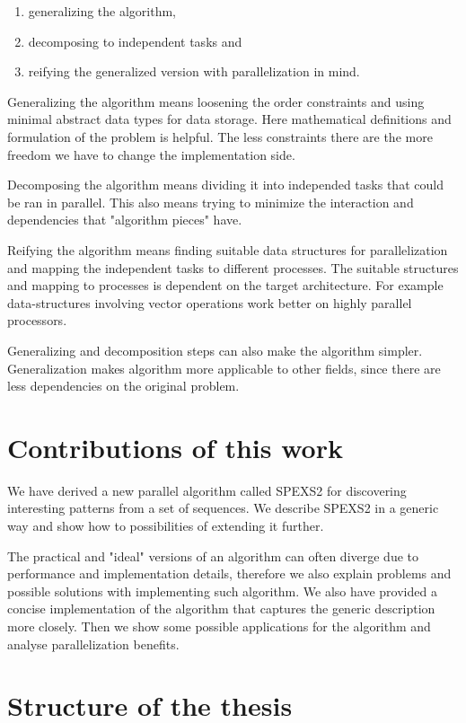 \begin{enumerate}
	\item generalizing the algorithm,
	\item decomposing to independent tasks and
	\item reifying the generalized version with parallelization in mind.
\end{enumerate}

Generalizing the algorithm means loosening the order constraints and using minimal abstract data types for data storage. Here mathematical definitions and formulation of the problem is helpful. The less constraints there are the more freedom we have to change the implementation side.

Decomposing the algorithm means dividing it into independed tasks that could be ran in parallel. This also means trying to minimize the interaction and dependencies that "algorithm pieces" have.

Reifying the algorithm means finding suitable data structures for parallelization and mapping the independent tasks to different processes. The suitable structures and mapping to processes is dependent on the target architecture. For example data-structures involving vector operations work better on highly parallel processors.

Generalizing and decomposition steps can also make the algorithm simpler. Generalization makes algorithm more applicable to other fields, since there are less dependencies on the original problem.

\section{Contributions of this work}

We have derived a new parallel algorithm called SPEXS2 for discovering interesting patterns from a set of sequences. We describe SPEXS2 in a generic way and show how to possibilities of extending it further.

The practical and "ideal" versions of an algorithm can often diverge due to performance and implementation details, therefore we also explain problems and possible solutions with implementing such algorithm. We also have provided a concise implementation of the algorithm that captures the generic description more closely. Then we show some possible applications for the algorithm and analyse parallelization benefits.

\section{Structure of the thesis}

